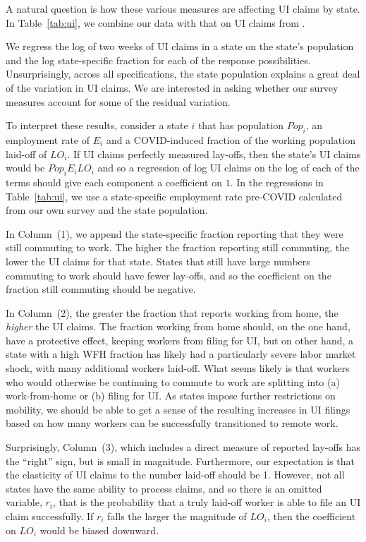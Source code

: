 \documentclass[12pt]{article}
\begin{document}


A natural question is how these various measures are affecting UI claims by state. 
In Table~\ref{tab:ui}, we combine our data with that on UI claims from \cite{goldsmith2020}.

We regress the log of two weeks of UI claims in a state on the state's population and the log state-specific fraction for each of the response possibilities.  
Unsurprisingly, across all specifications, the state population explains a great deal of the variation in UI claims.
We are interested in asking whether our survey measures account for some of the residual variation.

To interpret these results, consider a state $i$ that has population $Pop_i$, an employment rate of $E_i$ and a COVID-induced fraction of the working population laid-off of $LO_i$. If UI claims perfectly measured lay-offs, then the state's UI claims would be $Pop_i E_i LO_i$ and so a regression of log UI claims on the log of each of the terms should give each component a coefficient on $1$. 
In the regressions in Table~\ref{tab:ui}, we use a state-specific employment rate pre-COVID calculated from our own survey and the state population. 



In Column~(1), we append the state-specific fraction reporting that they were still commuting to work.
The higher the fraction reporting still commuting, the lower the UI claims for that state.
States that still have large numbers commuting to work should have fewer lay-offs, and so the coefficient on the fraction still commuting should be negative.

In Column~(2), the greater the fraction that reports working from home, the \emph{higher} the UI claims.
 The fraction working from home should, on the one hand, have a protective effect, keeping workers from filing for UI, but on other hand, a state with a high WFH fraction has likely had a particularly severe labor market shock, with many additional workers laid-off. 
What seems likely is that workers who would otherwise be continuing to commute to work are splitting into (a) work-from-home or (b) filing for UI.
As states impose further restrictions on mobility, we should be able to get a sense of the resulting increases in UI filings based on how many workers can be successfully transitioned to remote work. 

Surprisingly, Column~(3), which includes a direct measure of reported lay-offs has the ``right'' sign, but is small in magnitude.
Furthermore, our expectation is that the elasticity of UI claims to the number laid-off should be 1. 
However, not all states have the same ability to process claims, and so there is an omitted variable, $r_i$, that is the probability that a truly laid-off worker is able to file an UI claim successfully. If $r_i$ falls the larger the magnitude of $LO_i$, then the coefficient on $LO_i$ would be biased downward. 
\end{document}

